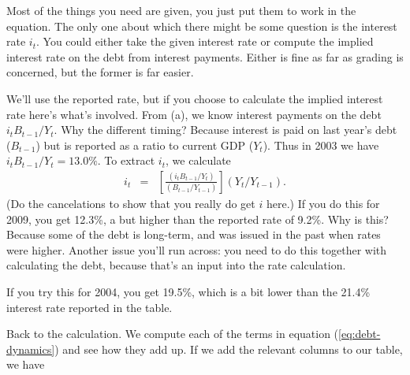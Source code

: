 \documentclass[12pt]{exam}
\begin{document}
\begin{questions}
\begin{solution}
\begin{parts}
Most of the things you need are given, you just put them to work in the equation.
The only one about which there might be some question is
the interest rate $i_t$.
You could either take the given interest rate
or compute the implied interest rate on the debt from interest payments.
Either is fine as far as grading is concerned, but the former is far easier.

We'll use the reported rate,
but if you choose to calculate the implied interest rate
here's what's involved.
From (a), we know interest payments on the debt $i_t B_{t-1}/Y_t$.
Why the different timing?  Because interest is paid on last year's debt ($B_{t-1}$)
but is reported as a ratio to current GDP ($Y_t$).
Thus in 2003 we have $i_t B_{t-1}/Y_t = 13.0\%$.
To extract $i_t$, we calculate
\begin{eqnarray*}
    i_t &=&  \left[ \frac{(i_t B_{t-1}/Y_t)}
            {(B_{t-1}/Y_{t-1})} \right]
            (Y_t/Y_{t-1}) .
\end{eqnarray*}
(Do the cancelations to show that you really do get $i$ here.)
If you do this for 2009, you get 12.3\%, a but higher than the reported rate of 9.2\%.
Why is this?  Because some of the debt is long-term, and
was issued in the past when rates were higher.
Another issue you'll run across:  you need to do this together with calculating
the debt, because that's an input into the rate calculation.

If you try this for 2004, you get 19.5\%,
which is a bit lower than the 21.4\%
interest rate reported in the table.

Back to the calculation.
We compute each of the terms in equation (\ref{eq:debt-dynamics})
and see how they add up.
If we add the relevant columns to our table, we have


\end{parts}
\end{solution}
\end{questions}
\end{document}
